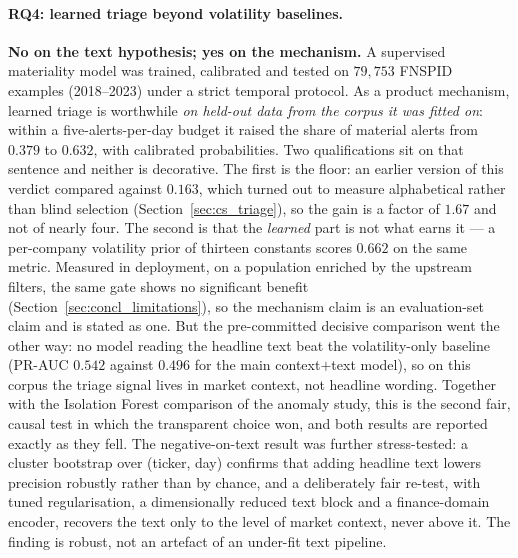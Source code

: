 \paragraph{RQ4: learned triage beyond volatility baselines.}
\textbf{No on the text hypothesis; yes on the mechanism.} A supervised materiality model was trained,
calibrated and tested on $79{,}753$ FNSPID examples (2018--2023) under a strict temporal protocol. As a
product mechanism, learned triage is worthwhile \emph{on held-out data from the corpus it was fitted
on}: within a five-alerts-per-day budget it raised the share of material alerts from $0.379$ to
$0.632$, with calibrated probabilities. Two qualifications sit on that sentence and neither is
decorative. The first is the floor: an earlier version of this verdict compared against $0.163$,
which turned out to measure alphabetical rather than blind selection
(Section~\ref{sec:cs_triage}), so the gain is a factor of $1.67$ and not of nearly four. The second
is that the \emph{learned} part is not what earns it --- a per-company volatility prior of thirteen
constants scores $0.662$ on the same metric. Measured in deployment,
on a population enriched by the upstream filters, the same gate shows no significant benefit
(Section~\ref{sec:concl_limitations}), so the mechanism claim is an evaluation-set claim and is stated
as one. But the
pre-committed decisive comparison went the other way: no model reading the headline text beat the
volatility-only baseline (PR-AUC $0.542$ against $0.496$ for the main context$+$text model), so on this
corpus the triage signal lives in market context, not headline wording. Together with the Isolation
Forest comparison of the anomaly study, this is the second fair, causal test in which the transparent
choice won, and both results are reported exactly as they fell. The negative-on-text result was
further stress-tested: a cluster bootstrap over (ticker, day) confirms that adding headline text
lowers precision robustly rather than by chance, and a deliberately fair re-test, with tuned
regularisation, a dimensionally reduced text block and a finance-domain encoder, recovers the text
only to the level of market context, never above it. The finding is robust, not an artefact of an
under-fit text pipeline.

